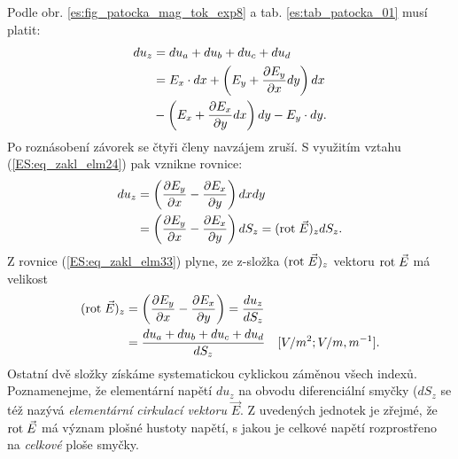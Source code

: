         Podle obr. \ref{es:fig_patocka_mag_tok_exp8} a tab. \ref{es:tab_patocka_01} musí platit:
        \begin{align}
          du_z &= du_a + du_b + du_c + du_d                                  \nonumber  \\ 
               &= E_x\cdot dx + \left(E_y + \dfrac{\partial E_y}{\partial x}dy\right)dx         \nonumber  \\
               &- \left(E_x + \dfrac{\partial E_x}{\partial y}dx\right)dy  - E_y\cdot dy . \label{ES:eq_zakl_elm32}
        \end{align}
        Po roznásobení závorek se čtyři členy navzájem zruší. S využitím vztahu 
        (\ref{ES:eq_zakl_elm24}) pak vznikne rovnice:
        \begin{align}
          du_z&= \left(\dfrac{\partial E_y}{\partial x} - \dfrac{\partial E_x}{\partial y}\right)dxdy              \nonumber \\
              &= \left(\dfrac{\partial E_y}{\partial x} - \dfrac{\partial E_x}{\partial y}\right)dS_z 
               = (\mathrm{rot}\;\vec{E})_z dS_z.                                   \label{ES:eq_zakl_elm33}
        \end{align}
        Z rovnice (\ref{ES:eq_zakl_elm33}) plyne, ze z-složka \((\mathrm{rot}\;\vec{E})_z\) vektoru \(\mathrm{rot}\;\vec{E}\) 
        má velikost
        \begin{align}
          (\mathrm{rot}\;\vec{E})_z &= \left(\dfrac{\partial E_y}{\partial x} - \dfrac{\partial E_x}{\partial y}\right)        
                       = \frac{du_z}{dS_z}                                   \nonumber  \\
                      &= \frac{du_a + du_b + du_c + du_d}{dS_z} 
                         \quad[V/m^2; V/m, m^{-1}].                    \label{ES:eq_zakl_elm34}
        \end{align}
        Ostatní dvě složky získáme systematickou cyklickou záměnou všech indexů. Poznamenejme, že 
        elementární napětí \(du_z\) na obvodu diferenciální smyčky (\(dS_z\) se též nazývá 
        \emph{elementární cirkulací vektoru} \(\vec{E}\). Z uvedených jednotek je zřejmé, že 
        \(\mathrm{rot}\;\vec{E}\) má význam plošné hustoty napětí, s jakou je celkové napětí rozprostřeno na 
        \emph{celkové} ploše smyčky.
      
